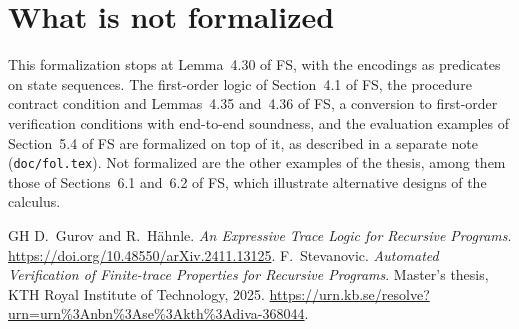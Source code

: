 \documentclass[11pt]{article}
\newcommand{\Th}[1]{#1 of FS}
\theoremstyle{plain}
\theoremstyle{definition}
\theoremstyle{remark}
\begin{document}
\section{What is not formalized}

This formalization stops at \Th{Lemma~4.30}, with the encodings as
predicates on state sequences. The first-order logic of
\Th{Section~4.1}, the procedure contract condition and
\Th{Lemmas~4.35 and~4.36}, a conversion to first-order verification
conditions with end-to-end soundness, and the evaluation examples of
\Th{Section~5.4} are formalized on top of it, as described in a separate
note (\texttt{doc/fol.tex}). Not formalized are the other examples of
the thesis, among them those of \Th{Sections~6.1 and~6.2}, which
illustrate alternative designs of the calculus.

\begin{thebibliography}{GH}
 D.~Gurov and R.~H\"ahnle. \emph{An Expressive Trace Logic
  for Recursive Programs}.
  \url{https://doi.org/10.48550/arXiv.2411.13125}.
 F.~Stevanovic. \emph{Automated Verification of Finite-trace
  Properties for Recursive Programs}. Master's thesis, KTH Royal Institute
  of Technology, 2025.
  \url{https://urn.kb.se/resolve?urn=urn\%3Anbn\%3Ase\%3Akth\%3Adiva-368044}.
\end{thebibliography}
\end{document}
